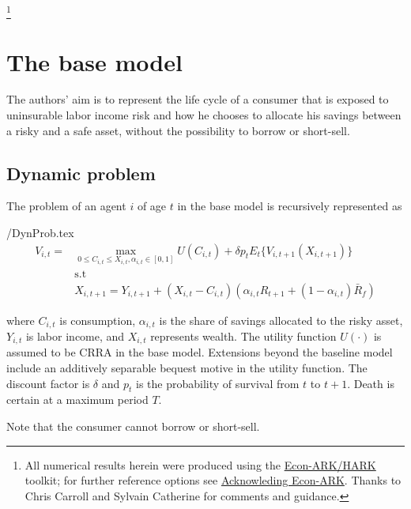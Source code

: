 \documentclass[./CGMPort.tex]{subfiles}
\begin{document}
\thanks{All numerical results herein were produced using the \href{https://econ-ark/HARK}{Econ-ARK/HARK} toolkit; for further reference options see \href{https://econ-ark.org/acknowledging/}{Acknowleding Econ-ARK}.  Thanks to Chris Carroll and Sylvain Catherine for comments and guidance.}

\titlepagefinish

\newtheorem{defn}{Definition}
\newtheorem{theorem}{Theorem}

\hypertarget{The-base-model}{}
\section{The base model}

The authors' aim is to represent the life cycle of a consumer that is exposed to uninsurable labor income risk and how he chooses to allocate his savings between a risky and a safe asset, without the possibility to borrow or short-sell.

\subsection{Dynamic problem}

The problem of an agent $i$ of age $t$ in the base model is recursively represented as

\begin{verbatimwrite}{\EqDir/DynProb.tex}
	\begin{align}
		V_{i,t} =& \max_{0\leq C_{i,t} \leq X_{i,t}, \alpha_{i,t}\in[0,1]} U(C_{i,t}) + \delta p_t E_t\{ V_{i,t+1} (X_{i,t+1}) \}\\
		&\text{s.t} \nonumber \\
		&X_{i,t+1} = Y_{i,t+1} + (X_{i,t} - C_{i,t})(\alpha_{i,t} R_{t+1} + (1-\alpha_{i,t})\bar{R}_f)
	\end{align}
\end{verbatimwrite}


where $C_{i,t}$ is consumption, $\alpha_{i,t}$ is the share of savings allocated to the risky asset, $Y_{i,t}$ is labor income, and $X_{i,t}$ represents wealth. The utility function $U(\cdot)$ is assumed to be CRRA in the base model. Extensions beyond the baseline model include an additively separable bequest motive in the utility function. The discount factor is $\delta$ and $p_t$ is the probability of survival from $t$ to $t+1$. Death is certain at a maximum period $T$.

Note that the consumer cannot borrow or short-sell.
\end{document}
